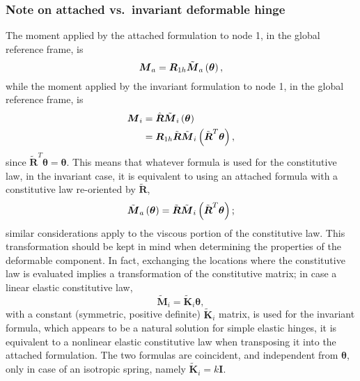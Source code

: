 \documentclass[10pt,dvips,fleqn]{report}
\newcommand{\T}[1]{\boldsymbol{#1}}
\begin{document}
\subsubsection{Note on attached vs.\ invariant deformable hinge}
The moment applied by the attached formulation to node 1,
in the global reference frame, is
\begin{equation}
	\T{M}_a = \T{R}_{1h} \tilde{\T{M}}_a\plbr{\T{\theta}} ,
\end{equation}
while the moment applied by the invariant formulation to node 1,
in the global reference frame, is
\begin{align}
	\T{M}_i &= \hat{\T{R}} \tilde{\T{M}}_i\plbr{\T{\theta}} \\
	&= \T{R}_{1h} \tilde{\T{R}} \tilde{\T{M}}_i\plbr{\tilde{\T{R}}^T \T{\theta}} ,
\end{align}
since $\tilde{\T{R}}^T \T{\theta}=\T{\theta}$.
This means that whatever formula is used for the constitutive law,
in the invariant case, it is equivalent to using an attached formula 
with a constitutive law re-oriented by $\tilde{\T{R}}$,
\begin{equation}
	\tilde{\T{M}}_a\plbr{\T{\theta}}
		= \tilde{\T{R}} \tilde{\T{M}}_i\plbr{\tilde{\T{R}}^T \T{\theta}} ;
\end{equation}
similar considerations apply to the viscous portion of the constitutive law.
This transformation should be kept in mind when determining the properties
of the deformable component.
In fact, exchanging the locations where the constitutive law is evaluated
implies a transformation of the constitutive matrix; in case a linear elastic
constitutive law,
\begin{equation}
	\tilde{\T{M}}_i = \tilde{\T{K}}_i \T{\theta} ,
\end{equation}
with a constant (symmetric, positive definite) $\tilde{\T{K}}_i$ matrix,
is used for the invariant formula, which appears to be a natural solution 
for simple elastic hinges, it is equivalent to a nonlinear elastic 
constitutive law when transposing it into the attached formulation.
The two formulas are coincident, and independent from $\T{\theta}$,
only in case of an isotropic spring, namely $\tilde{\T{K}}_i=k\T{I}$.
\end{document}
